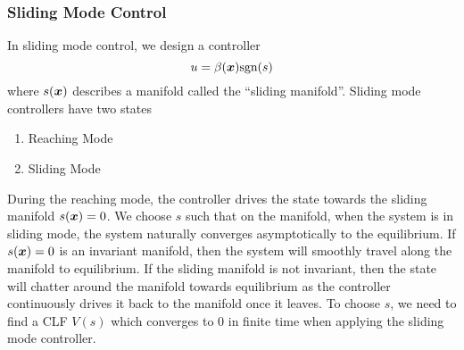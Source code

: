 \subsubsection{Sliding Mode Control}
In sliding mode control, we design a controller \[
	u = \beta(\boldsymbol{x})\text{sgn}(s)
\]
where $s(\boldsymbol{x})$ describes a manifold called the ``sliding manifold''. Sliding mode
controllers have two states
\begin{enumerate}
	\item Reaching Mode
	\item Sliding Mode
\end{enumerate}
During the reaching mode, the controller drives the state towards the sliding
manifold $s(\boldsymbol{x}) = 0$. We choose $s$ such that on the manifold, when the
system is in sliding mode, the system
naturally converges asymptotically to the equilibrium. If $s(\boldsymbol{x}) = 0$ is an
invariant manifold, then the system will smoothly travel along the manifold to
equilibrium. If the sliding manifold is not invariant, then the state will
chatter around the manifold towards equilibrium as the controller continuously
drives it back to the manifold once it leaves. To choose $s$, we need to find a CLF $V(s)$ which
converges to $0$ in finite time when applying the sliding mode controller.

